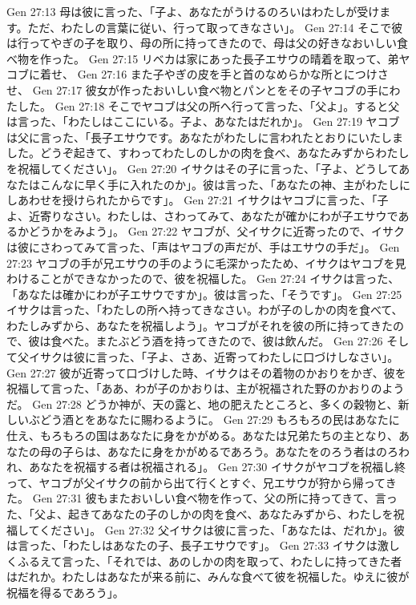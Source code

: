 Gen 27:13  母は彼に言った、「子よ、あなたがうけるのろいはわたしが受けます。ただ、わたしの言葉に従い、行って取ってきなさい」。
Gen 27:14  そこで彼は行ってやぎの子を取り、母の所に持ってきたので、母は父の好きなおいしい食べ物を作った。
Gen 27:15  リベカは家にあった長子エサウの晴着を取って、弟ヤコブに着せ、
Gen 27:16  また子やぎの皮を手と首のなめらかな所とにつけさせ、
Gen 27:17  彼女が作ったおいしい食べ物とパンとをその子ヤコブの手にわたした。
Gen 27:18  そこでヤコブは父の所へ行って言った、「父よ」。すると父は言った、「わたしはここにいる。子よ、あなたはだれか」。
Gen 27:19  ヤコブは父に言った、「長子エサウです。あなたがわたしに言われたとおりにいたしました。どうぞ起きて、すわってわたしのしかの肉を食べ、あなたみずからわたしを祝福してください」。
Gen 27:20  イサクはその子に言った、「子よ、どうしてあなたはこんなに早く手に入れたのか」。彼は言った、「あなたの神、主がわたしにしあわせを授けられたからです」。
Gen 27:21  イサクはヤコブに言った、「子よ、近寄りなさい。わたしは、さわってみて、あなたが確かにわが子エサウであるかどうかをみよう」。
Gen 27:22  ヤコブが、父イサクに近寄ったので、イサクは彼にさわってみて言った、「声はヤコブの声だが、手はエサウの手だ」。
Gen 27:23  ヤコブの手が兄エサウの手のように毛深かったため、イサクはヤコブを見わけることができなかったので、彼を祝福した。
Gen 27:24  イサクは言った、「あなたは確かにわが子エサウですか」。彼は言った、「そうです」。
Gen 27:25  イサクは言った、「わたしの所へ持ってきなさい。わが子のしかの肉を食べて、わたしみずから、あなたを祝福しよう」。ヤコブがそれを彼の所に持ってきたので、彼は食べた。またぶどう酒を持ってきたので、彼は飲んだ。
Gen 27:26  そして父イサクは彼に言った、「子よ、さあ、近寄ってわたしに口づけしなさい」。
Gen 27:27  彼が近寄って口づけした時、イサクはその着物のかおりをかぎ、彼を祝福して言った、「ああ、わが子のかおりは、主が祝福された野のかおりのようだ。
Gen 27:28  どうか神が、天の露と、地の肥えたところと、多くの穀物と、新しいぶどう酒とをあなたに賜わるように。
Gen 27:29  もろもろの民はあなたに仕え、もろもろの国はあなたに身をかがめる。あなたは兄弟たちの主となり、あなたの母の子らは、あなたに身をかがめるであろう。あなたをのろう者はのろわれ、あなたを祝福する者は祝福される」。
Gen 27:30  イサクがヤコブを祝福し終って、ヤコブが父イサクの前から出て行くとすぐ、兄エサウが狩から帰ってきた。
Gen 27:31  彼もまたおいしい食べ物を作って、父の所に持ってきて、言った、「父よ、起きてあなたの子のしかの肉を食べ、あなたみずから、わたしを祝福してください」。
Gen 27:32  父イサクは彼に言った、「あなたは、だれか」。彼は言った、「わたしはあなたの子、長子エサウです」。
Gen 27:33  イサクは激しくふるえて言った、「それでは、あのしかの肉を取って、わたしに持ってきた者はだれか。わたしはあなたが来る前に、みんな食べて彼を祝福した。ゆえに彼が祝福を得るであろう」。
